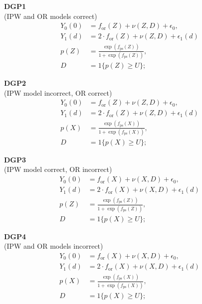 \begin{multicols}{2}

\textbf{DGP1} \\
(IPW and OR models correct)
\begin{align*}
    Y_0(0) &= f_{\text{or}}(Z) + \nu(Z, D) + \epsilon_0, \\
    Y_1(d) &= 2 \cdot f_{\text{or}}(Z) + \nu(Z, D) + \epsilon_1(d) \\
    p(Z) &= \frac{\exp \left( f_{\text{ps}}(Z) \right)}{1 + \exp \left( f_{\text{ps}}(Z) \right)}, \\
    D &= 1\{ p(Z) \geq U \};
\end{align*}

\textbf{DGP2} \\
(IPW model incorrect, OR correct)
\begin{align*}
    Y_0(0) &= f_{\text{or}}(Z) + \nu(Z, D) + \epsilon_0, \\
    Y_1(d) &= 2 \cdot f_{\text{or}}(Z) + \nu(Z, D) + \epsilon_1(d) \\
    p(X) &= \frac{\exp \left( f_{\text{ps}}(X) \right)}{1 + \exp \left( f_{\text{ps}}(X) \right)}, \\
    D &= 1\{ p(X) \geq U \};
\end{align*}

\columnbreak

\textbf{DGP3}\\
(IPW model correct, OR incorrect)
\begin{align*}
    Y_0(0) &= f_{\text{or}}(X) + \nu(X, D) + \epsilon_0, \\
    Y_1(d) &= 2 \cdot f_{\text{or}}(X) + \nu(X, D) + \epsilon_1(d) \\
    p(Z) &= \frac{\exp \left( f_{\text{ps}}(Z) \right)}{1 + \exp \left( f_{\text{ps}}(Z) \right)}, \\
    D &= 1\{ p(X) \geq U \};
\end{align*}

\textbf{DGP4 } \\
(IPW and OR models incorrect)
\begin{align*}
    Y_0(0) &= f_{\text{or}}(X) + \nu(X, D) + \epsilon_0, \\
    Y_1(d) &= 2 \cdot f_{\text{or}}(X) + \nu(X, D) + \epsilon_1(d) \\
    p(X) &= \frac{\exp \left( f_{\text{ps}}(X) \right)}{1 + \exp \left( f_{\text{ps}}(X) \right)}, \\
    D &= 1\{ p(X) \geq U \};
\end{align*}

\end{multicols}

